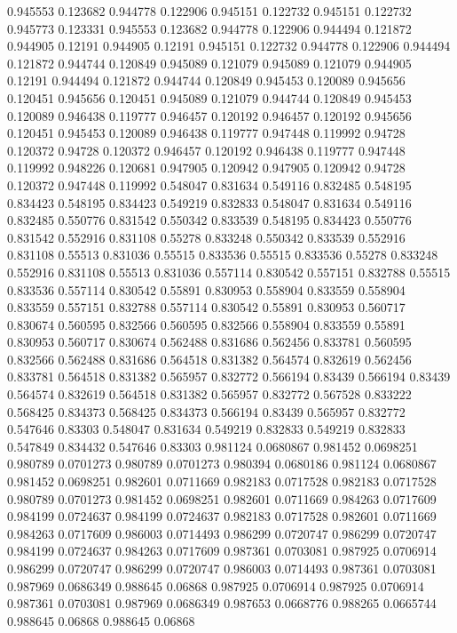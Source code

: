 0.945553 0.123682
0.944778 0.122906
0.945151 0.122732
0.945151 0.122732
0.945773 0.123331
0.945553 0.123682
0.944778 0.122906
0.944494 0.121872
0.944905 0.12191
0.944905 0.12191
0.945151 0.122732
0.944778 0.122906
0.944494 0.121872
0.944744 0.120849
0.945089 0.121079
0.945089 0.121079
0.944905 0.12191
0.944494 0.121872
0.944744 0.120849
0.945453 0.120089
0.945656 0.120451
0.945656 0.120451
0.945089 0.121079
0.944744 0.120849
0.945453 0.120089
0.946438 0.119777
0.946457 0.120192
0.946457 0.120192
0.945656 0.120451
0.945453 0.120089
0.946438 0.119777
0.947448 0.119992
0.94728 0.120372
0.94728 0.120372
0.946457 0.120192
0.946438 0.119777
0.947448 0.119992
0.948226 0.120681
0.947905 0.120942
0.947905 0.120942
0.94728 0.120372
0.947448 0.119992
0.548047 0.831634
0.549116 0.832485
0.548195 0.834423
0.548195 0.834423
0.549219 0.832833
0.548047 0.831634
0.549116 0.832485
0.550776 0.831542
0.550342 0.833539
0.548195 0.834423
0.550776 0.831542
0.552916 0.831108
0.55278 0.833248
0.550342 0.833539
0.552916 0.831108
0.55513 0.831036
0.55515 0.833536
0.55515 0.833536
0.55278 0.833248
0.552916 0.831108
0.55513 0.831036
0.557114 0.830542
0.557151 0.832788
0.55515 0.833536
0.557114 0.830542
0.55891 0.830953
0.558904 0.833559
0.558904 0.833559
0.557151 0.832788
0.557114 0.830542
0.55891 0.830953
0.560717 0.830674
0.560595 0.832566
0.560595 0.832566
0.558904 0.833559
0.55891 0.830953
0.560717 0.830674
0.562488 0.831686
0.562456 0.833781
0.560595 0.832566
0.562488 0.831686
0.564518 0.831382
0.564574 0.832619
0.562456 0.833781
0.564518 0.831382
0.565957 0.832772
0.566194 0.83439
0.566194 0.83439
0.564574 0.832619
0.564518 0.831382
0.565957 0.832772
0.567528 0.833222
0.568425 0.834373
0.568425 0.834373
0.566194 0.83439
0.565957 0.832772
0.547646 0.83303
0.548047 0.831634
0.549219 0.832833
0.549219 0.832833
0.547849 0.834432
0.547646 0.83303
0.981124 0.0680867
0.981452 0.0698251
0.980789 0.0701273
0.980789 0.0701273
0.980394 0.0680186
0.981124 0.0680867
0.981452 0.0698251
0.982601 0.0711669
0.982183 0.0717528
0.982183 0.0717528
0.980789 0.0701273
0.981452 0.0698251
0.982601 0.0711669
0.984263 0.0717609
0.984199 0.0724637
0.984199 0.0724637
0.982183 0.0717528
0.982601 0.0711669
0.984263 0.0717609
0.986003 0.0714493
0.986299 0.0720747
0.986299 0.0720747
0.984199 0.0724637
0.984263 0.0717609
0.987361 0.0703081
0.987925 0.0706914
0.986299 0.0720747
0.986299 0.0720747
0.986003 0.0714493
0.987361 0.0703081
0.987969 0.0686349
0.988645 0.06868
0.987925 0.0706914
0.987925 0.0706914
0.987361 0.0703081
0.987969 0.0686349
0.987653 0.0668776
0.988265 0.0665744
0.988645 0.06868
0.988645 0.06868
